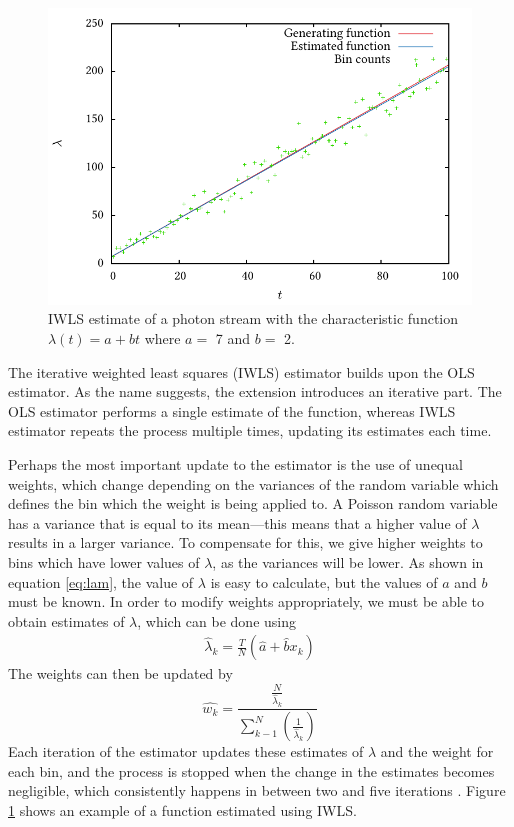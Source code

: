 \documentclass[a4paper,11pt,twoside]{article}
\begin{document}
    \begin{figure}[h]
    \includegraphics{images/lineest}
    \caption{IWLS estimate of a photon stream with the characteristic function
    $\lambda(t)=a+bt$ where $a=$ 7 and $b=$ 2.}
    \label{linefig}
    \end{figure}
    The iterative weighted least squares (IWLS) estimator builds upon the OLS
    estimator. As the name suggests, the extension introduces an iterative
    part. The OLS estimator performs a single estimate of the function, whereas
    IWLS estimator repeats the process multiple times, updating its estimates
    each time.

    Perhaps the most important update to the estimator is the use of unequal
    weights, which change depending on the variances of the random variable
    which defines the bin which the weight is being applied to. A Poisson random
    variable has a variance that is equal to its mean---this means that a higher
    value of $\lambda$ results in a larger variance. To compensate for this,
    we give higher weights to bins which have lower values of $\lambda$, as the
    variances will be lower. As shown in equation \eqref{eq:lam}, the value of
    $\lambda$ is easy to calculate, but the values of $a$ and $b$ must be
    known. In order to modify weights appropriately, we must be able to obtain
    estimates of $\lambda$, which can be done using \cite{massey1996estimating}
    \begin{align}
    \hat{\lambda}_k=\frac{T}{N}(\hat{a}+\hat{b}x_k)
    \end{align}
    The weights can then be updated by
    \begin{equation}
    \hat{w_k}=\frac{\displaystyle \frac{N}{\hat{\lambda}_k}}{\displaystyle \sum_{k-1}^N\left(\frac{1}{\hat{\lambda}_k}\right)}
    \end{equation}
    Each iteration of the estimator updates these estimates of $\lambda$ and the
    weight for each bin, and the process is stopped when the change in the
    estimates becomes negligible, which consistently happens in between two and
    five iterations \cite{massey1996estimating}. Figure \ref{linefig} shows an
    example of a function estimated using IWLS.
\end{document}
